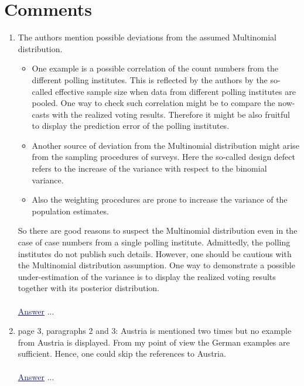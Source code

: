 \documentclass{scrartcl}
\newcommand{\blue}[1]{\textcolor{MidnightBlue}{\underline{\textcolor{MidnightBlue}{#1}}}}
\begin{document}
\section*{Comments}
\begin{enumerate}
  \item The authors mention possible deviations from the assumed Multinomial distribution.
  \begin{itemize}
    \item One example is a possible correlation of the count numbers from the different polling institutes. This is reflected by the authors by the so-called effective sample size when data from different polling institutes are pooled. One way to check such correlation might be to compare the now-casts with the realized voting results. Therefore it might be also fruitful to display the prediction error of the polling institutes.
    \item Another source of deviation from the Multinomial distribution might arise from the sampling procedures of surveys. Here the so-called design defect refers to the increase of the variance with respect to the binomial variance.
    \item Also the weighting procedures are prone to increase the variance of the population estimates.
  \end{itemize}
  So there are good reasons to suspect the Multinomial distribution even in the case of case numbers from a single polling institute. Admittedly, the polling
institutes do not publish such details. However, one should be cautious with the Multinomial distribution assumption. One way to demonstrate a possible under-estimation of the variance is to display the realized voting results together with its posterior distribution.
  \\ \\
  \blue{Answer} ...

  \item page 3, paragraphs 2 and 3: Austria is  mentioned two times but no example from Austria is displayed. From my point of view the German examples are sufficient. Hence, one could skip the references to Austria.
  \\ \\
  \blue{Answer} ...
\end{enumerate}
\end{document}
